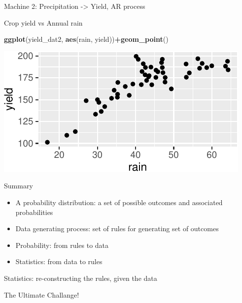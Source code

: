 \documentclass[
  12pt,
  ignorenonframetext,
  aspectratio=169,
]{beamer}
\newenvironment{Shaded}{\begin{snugshade}}{\end{snugshade}}
\newcommand{\KeywordTok}[1]{\textcolor[rgb]{0.13,0.29,0.53}{\textbf{#1}}}
\newcommand{\NormalTok}[1]{#1}
\newcommand{\OperatorTok}[1]{\textcolor[rgb]{0.81,0.36,0.00}{\textbf{#1}}}
\providecommand{\tightlist}{%
  \setlength{\itemsep}{0pt}\setlength{\parskip}{0pt}}
\begin{document}
\begin{frame}[fragile]{Machine 2: Precipitation -\textgreater{} Yield,
AR process}
\protect\hypertarget{machine-2-precipitation---yield-ar-process-3}{}

\begin{block}{Crop yield vs Annual rain}

\begin{Shaded}
\begin{Highlighting}[]
\KeywordTok{ggplot}\NormalTok{(yield_dat2, }\KeywordTok{aes}\NormalTok{(rain, yield))}\OperatorTok{+}\KeywordTok{geom_point}\NormalTok{()}
\end{Highlighting}
\end{Shaded}

\begin{center}\includegraphics{Lecture-2_files/figure-beamer/unnamed-chunk-9-1} \end{center}

\end{block}

\end{frame}

\begin{frame}{Summary}
\protect\hypertarget{summary}{}

\begin{itemize}
\tightlist
\item
  A probability distribution: a set of possible outcomes and associated
  probabilities
\item
  Data generating process: set of rules for generating set of outcomes
\item
  Probability: from rules to data
\item
  Statistics: from data to rules
\end{itemize}

\begin{block}{Statistics: re-constructing the rules, given the data}

\end{block}

\begin{block}{The Ultimate Challange!}

\end{block}

\end{frame}
\end{document}
